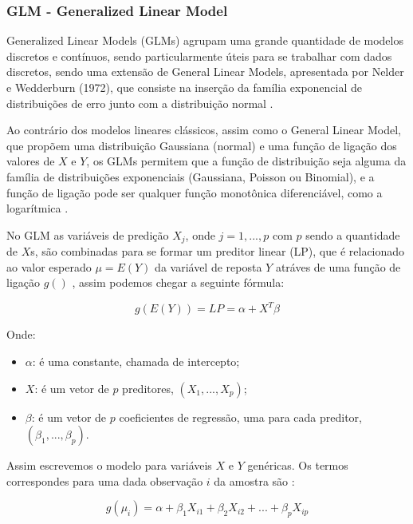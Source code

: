 \documentclass[
	12pt,				%
	openright,			%
	oneside,			%
	a4paper,			%
	english,			%
	brazil				%
	]{abntex2}
\begin{document}
\subsubsection{GLM - Generalized Linear Model}

Generalized Linear Models (GLMs) agrupam uma grande quantidade de modelos discretos e contínuos, sendo particularmente úteis 
para se trabalhar com dados discretos, sendo uma extensão de General Linear Models, apresentada por Nelder e Wedderburn 
(1972), que consiste na inserção da família exponencial de distribuições de erro junto com a distribuição normal \cite{GLM}.

Ao contrário dos modelos lineares clássicos, assim como o General Linear Model, que propõem uma distribuição Gaussiana (normal) 
e uma função de ligação dos valores de $X$ e $Y$, os GLMs permitem que a função de distribuição seja alguma da família de distribuições 
exponenciais (Gaussiana, Poisson ou Binomial), e a função de ligação pode ser qualquer função monotônica 
diferenciável, como a logarítmica \cite{GAMeGLM_especie_estudo}.

No GLM as variáveis de predição $X_j$, onde $j = 1, ..., p$ com $p$ sendo a quantidade de $X$s, são combinadas para se formar um 
preditor linear (LP), que é relacionado ao valor esperado $\mu = E(Y)$ da variável  de reposta $Y$ atráves de uma função de ligação $g()$ 
\cite{GAMeGLM_especie_estudo}, assim podemos chegar a seguinte fórmula: 

\begin{equation}
	\label{GLM_general_eq}
	g(E(Y)) = LP = \alpha + X^T \beta
\end{equation}

Onde:
\begin{itemize}
	\item $\alpha$: é uma constante, chamada de intercepto;
	\item $X$: é um vetor de $p$ preditores, $(X_1, ..., X_p)$;
	\item $\beta$: é um vetor de $p$ coeficientes de regressão, uma para cada preditor, $(\beta_1, ..., \beta_p)$.
\end{itemize}

Assim escrevemos o modelo para variáveis $X$ e $Y$ genéricas. Os termos correspondes para uma dada observação $i$ da 
amostra são \cite{GAMeGLM_especie_estudo}:

\begin{equation}
	\label{GLM_observ_eq}
	g(\mu_i) = \alpha + \beta_1X_{i1} + \beta_2X_{i2} + ... + \beta_pX_{ip}
\end{equation}
\end{document}
